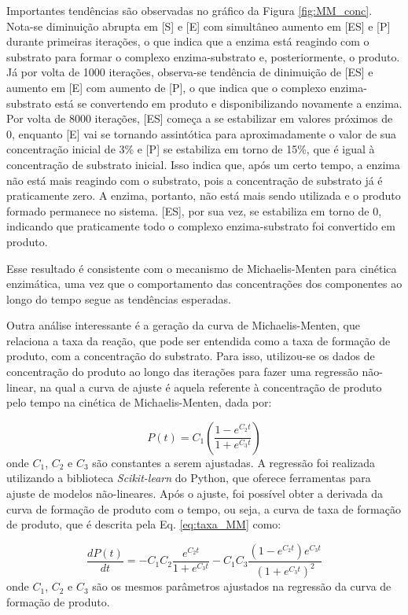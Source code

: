 \documentclass[12pt,oneside]{report}
\begin{document}
Importantes tendências são observadas no gráfico da Figura \ref{fig:MM_conc}. Nota-se diminuição abrupta em [S] e [E] com simultâneo aumento em [ES] e [P] durante primeiras iterações, o que indica que a enzima está reagindo com o substrato para formar o complexo enzima-substrato e, posteriormente, o produto. Já por volta de 1000 iterações, observa-se tendência de dinimuição de [ES] e aumento em [E] com aumento de [P], o que indica que o complexo enzima-substrato está se convertendo em produto e disponibilizando novamente a enzima. Por volta de 8000 iterações, [ES] começa a se estabilizar em valores próximos de 0, enquanto [E] vai se tornando assintótica para aproximadamente o valor de sua concentração inicial de 3\% e [P] se estabiliza em torno de 15\%, que é igual à concentração de substrato inicial. Isso indica que, após um certo tempo, a enzima não está mais reagindo com o substrato, pois a concentração de substrato já é praticamente zero. A enzima, portanto, não está mais sendo utilizada e o produto formado permanece no sistema. [ES], por sua vez, se estabiliza em torno de 0, indicando que praticamente todo o complexo enzima-substrato foi convertido em produto.

Esse resultado é consistente com o mecanismo de Michaelis-Menten para cinética enzimática, uma vez que o comportamento das concentrações dos componentes ao longo do tempo segue as tendências esperadas.

Outra análise interessante é a geração da curva de Michaelis-Menten, que relaciona a taxa da reação, que pode ser entendida como a taxa de formação de produto, com a concentração do substrato. Para isso, utilizou-se os dados de concentração do produto ao longo das iterações para fazer uma regressão não-linear, na qual a curva de ajuste é aquela referente à concentração de produto pelo tempo na cinética de Michaelis-Menten, dada por:

\begin{equation}
    \label{eq:produto_MM}
    P(t) = C_1 \left(\frac{1 - e^{C_2 t}}{1 + e^{C_3 t}}\right)
\end{equation}
onde $C_1$, $C_2$ e $C_3$ são constantes a serem ajustadas. A regressão foi realizada utilizando a biblioteca \textit{Scikit-learn} do Python, que oferece ferramentas para ajuste de modelos não-lineares. Após o ajuste, foi possível obter a derivada da curva de formação de produto com o tempo, ou seja, a curva de taxa de formação de produto, que é descrita pela Eq. \ref{eq:taxa_MM} como:

\begin{equation}
    \label{eq:taxa_MM}
    \frac{dP(t)}{dt} = -C_1 C_2 \frac{e^{C_2 t}}{1 + e^{C_3 t}} - C_1 C_3 \frac{(1 - e^{C_2 t}) e^{C_3 t}}{(1 + e^{C_3 t})^2}
\end{equation}
onde $C_1$, $C_2$ e $C_3$ são os mesmos parâmetros ajustados na regressão da curva de formação de produto.
\end{document}
